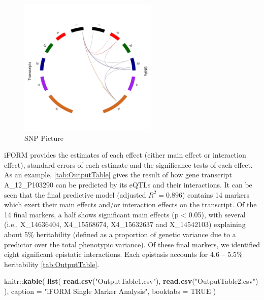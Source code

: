 \documentclass[11pt,]{book}
\newenvironment{Shaded}{\begin{snugshade}}{\end{snugshade}}
\newcommand{\KeywordTok}[1]{\textcolor[rgb]{0.13,0.29,0.53}{\textbf{{#1}}}}
\newcommand{\DataTypeTok}[1]{\textcolor[rgb]{0.13,0.29,0.53}{{#1}}}
\newcommand{\StringTok}[1]{\textcolor[rgb]{0.31,0.60,0.02}{{#1}}}
\newcommand{\OtherTok}[1]{\textcolor[rgb]{0.56,0.35,0.01}{{#1}}}
\newcommand{\NormalTok}[1]{{#1}}
\theoremstyle{definition}
\theoremstyle{definition}
\theoremstyle{remark}
\begin{document}
\begin{figure}

{\centering \includegraphics[width=250px,height=250px]{images/iForm_Network_Chr1} 

}

\caption{SNP Picture}\label{fig:ChromosomePic}
\end{figure}

iFORM provides the estimates of each effect (either main effect or
interaction effect), standard errors of each estimate and the
significance tests of each effect. As an example, \ref{tab:OutputTable}
gives the result of how gene transcript A\_12\_P103290 can be predicted
by its eQTLs and their interactions. It can be seen that the final
predictive model (adjusted \(R^2 = 0.896\)) contains 14 markers which
exert their main effects and/or interaction effects on the transcript.
Of the 14 final markers, a half shows significant main effects (p
\textless{} 0.05), with several (i.e., X\_14636404, X4\_15568674,
X4\_15632637 and X\_14542103) explaining about 5\% heritability (defined
as a proportion of genetic variance due to a predictor over the total
phenotypic variance). Of these final markers, we identified eight
significant epistatic interactions. Each epistasis accounts for 4.6 --
5.5\% heritability \ref{tab:OutputTable}.

\begin{Shaded}
\begin{Highlighting}[]
\NormalTok{knitr::}\KeywordTok{kable}\NormalTok{(}
  \KeywordTok{list}\NormalTok{(}
    \KeywordTok{read.csv}\NormalTok{(}\StringTok{"OutputTable1.csv"}\NormalTok{),}
    \KeywordTok{read.csv}\NormalTok{(}\StringTok{"OutputTable2.csv"}\NormalTok{)}
  \NormalTok{),}
  \DataTypeTok{caption =} \StringTok{"iFORM         Single Marker Analysis"}\NormalTok{,}
  \DataTypeTok{booktabs =} \OtherTok{TRUE}
\NormalTok{)}
\end{Highlighting}
\end{Shaded}
\end{document}
